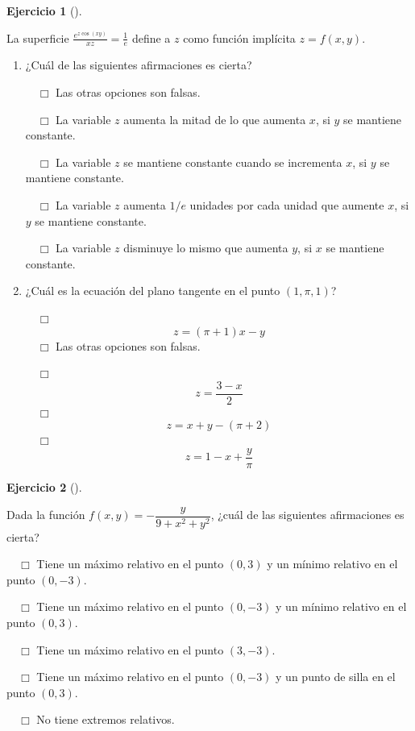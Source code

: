 \documentclass[
  a4paper,
]{scrreport}
\theoremstyle{definition}
\newtheorem{exercise}{Ejercicio}[chapter]
\theoremstyle{remark}
\begin{document}
\begin{exercise}[]\protect\hypertarget{exr-derivadas-funciones-varias-variables-propuesto-4}{}\label{exr-derivadas-funciones-varias-variables-propuesto-4}

La superficie \(\frac{e^{z\cos(xy)}}{xz}=\frac{1}{e}\) define a \(z\)
como función implícita \(z=f(x,y)\).

\begin{enumerate}
\def\labelenumi{\alph{enumi}.}
\item
  ¿Cuál de las siguientes afirmaciones es cierta?

  ${\quad\Box}$ Las otras opciones son falsas.

  ${\quad\Box}$ La variable $z$ aumenta la mitad de lo que aumenta $x$, si $y$ se mantiene constante.

  ${\quad\Box}$ La variable $z$ se mantiene constante cuando se incrementa $x$, si $y$ se mantiene constante.

  ${\quad\Box}$ La variable $z$ aumenta $1/e$ unidades por cada unidad que aumente $x$, si $y$ se mantiene constante.

  ${\quad\Box}$ La variable $z$ disminuye lo mismo que aumenta $y$, si $x$ se mantiene constante.
\item
  ¿Cuál es la ecuación del plano tangente en el punto \((1,\pi,1)\)?

  ${\quad\Box}$ $$z=(\pi+1)x-y$$
  ${\quad\Box}$ Las otras opciones son falsas.

  ${\quad\Box}$ $$z=\frac{3-x}{2}$$
  ${\quad\Box}$ $$z=x+y-(\pi+2)$$
  ${\quad\Box}$ $$z=1-x+\frac{y}{\pi}$$
\end{enumerate}

\end{exercise}

\begin{exercise}[]\protect\hypertarget{exr-derivadas-funciones-varias-variables-propuesto-5}{}\label{exr-derivadas-funciones-varias-variables-propuesto-5}

Dada la función \(f(x,y)=-\dfrac{y}{9+x^2+y^2}\), ¿cuál de las
siguientes afirmaciones es cierta?

${\quad\Box}$ Tiene un máximo relativo en el punto $(0,3)$ y un mínimo relativo en el punto $(0,-3)$.

${\quad\Box}$ Tiene un máximo relativo en el punto $(0,-3)$ y un mínimo relativo en el punto $(0,3)$.

${\quad\Box}$ Tiene un máximo relativo en el punto $(3,-3)$.

${\quad\Box}$ Tiene un máximo relativo en el punto $(0,-3)$ y un punto de silla en el punto $(0,3)$.

${\quad\Box}$ No tiene extremos relativos.

\end{exercise}
\end{document}
